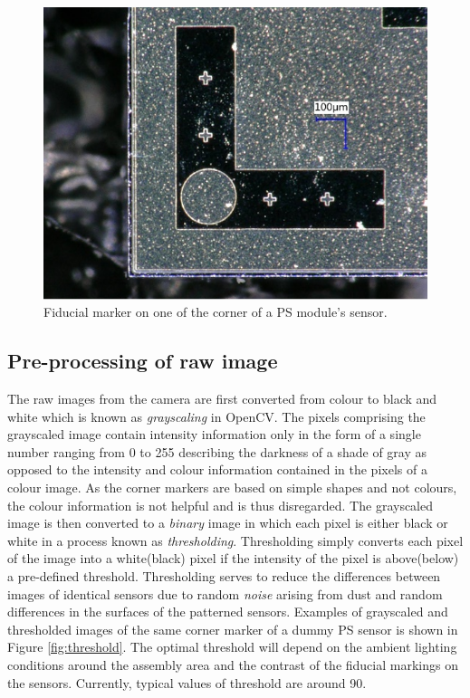 \begin{figure}[ht]\centering
\includegraphics[width=0.7\linewidth]{Data/Control_Software/Fiducial_marker.png}
\caption{Fiducial marker on one of the corner of a PS module's sensor.}
\label{fig:fiducial_marker}
\end{figure}

\subsection{Pre-processing of raw image}
The raw images from the camera are first converted from colour to black and white which is known as \emph{grayscaling} in OpenCV. The pixels comprising the grayscaled image contain intensity information only in the form of a single number ranging from 0 to 255 describing the darkness of a shade of gray as opposed to the intensity and colour information contained in the pixels of a colour image. As the corner markers are based on simple shapes and not colours, the colour information is not helpful and is thus disregarded. The grayscaled image is then converted to a \emph{binary} image in which each pixel is either black or white in a process known as \emph{thresholding}. Thresholding simply converts each pixel of the image into a white(black) pixel if the intensity of the pixel is above(below) a pre-defined threshold. Thresholding serves to reduce the differences between images of identical sensors due to random \emph{noise} arising from dust and random differences in the surfaces of the patterned sensors. Examples of grayscaled and thresholded images of the same corner marker of a dummy PS sensor is shown in Figure \ref{fig:threshold}. The optimal threshold will depend on the ambient lighting conditions around the assembly area and the contrast of the fiducial markings on the sensors. Currently, typical values of threshold are around 90.


